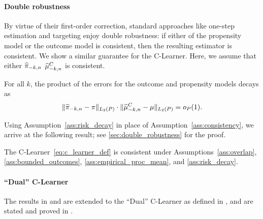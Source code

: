\paragraph{Double robustness}

By virtue of their first-order correction, standard approaches like one-step estimation and targeting enjoy double robustness: if either of the propensity model or the outcome model is consistent, then the resulting estimator is consistent. We show a similar guarantee for the C-Learner. 
Here, 
we assume that either $\widehat{\pi}_{-k,n}$ $\widehat{\mu}_{-k,n}^C$ is consistent.
\vspace{-0.9em}
\begin{assumption}\label{ass:risk_decay}
For all $k$, the product of the errors for the outcome and propensity
models decays as
\vspace{-0.7em}
    $$\|\widehat{\pi}_{-k,n} - \pi\|_{L_2(P)}
    \cdot \|\widehat{\mu}^C_{-k,n} - \mu\|_{L_2(P)}=o_P(1).$$
\end{assumption}

Using Assumption~\ref{ass:risk_decay} in place of Assumption~\ref{ass:consistency}, we arrive at the following result; see \cref{sec:double_robustness} for the proof.
\begin{theorem}
\label{thm:dr}
The C-Learner~\eqref{eq:c_learner_def} is consistent under Assumptions~\ref{ass:overlap}, \ref{ass:bounded_outcomes}, \ref{ass:empirical_proc_mean}, and 
\ref{ass:risk_decay}.
\end{theorem}

\vspace{-0.3em}
\paragraph{``Dual'' C-Learner}
The results in  and  are extended to the ``Dual'' C-Learner as defined in , and are stated and proved in . 

